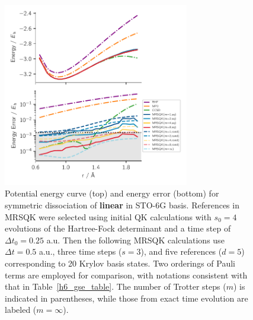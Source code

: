 \documentclass[journal=jctcce,manuscript=article]{achemso}
\newcommand{\methodabbr}[0]{MRSQK\xspace}
\begin{document}
\begin{figure}[h!]
  \centering
  \includegraphics[width=3.2in]{figs/H6_pes_error.pdf}
  \caption{Potential energy curve (top) and energy error (bottom) for symmetric dissociation of \textbf{linear } in STO-6G basis.
  References in \methodabbr were selected using initial QK calculations with $s_0 = 4$ evolutions of the Hartree-Fock determinant and a time step of $ \Delta t_0 = 0.25$ a.u.
  Then the following \methodabbr calculations use $ \Delta t = 0.5$ a.u., three time steps ($s=3$), and five references ($d=5$) corresponding to 20 Krylov basis states. 
  Two orderings of Pauli terms are employed for comparison, with notations consistent with that in Table~\ref{h6_gse_table}.
  The number of Trotter steps ($m$) is indicated in parentheses, while those from exact time evolution are labeled ($m = \infty$).
   }
\label{h6_pes}
\end{figure}
\end{document}
